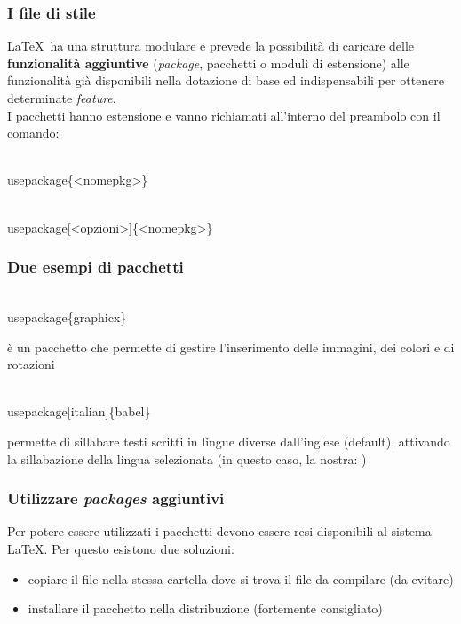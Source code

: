 \documentclass[10pt,svgnames,%
ucs,%
pdftex]{mybeamer}
\begin{document}
\begin{frame}
	\frametitle{I file di stile}
	\LaTeX\ ha una struttura modulare e prevede la possibilit\`a di
	caricare delle \textbf{funzionalit\`a aggiuntive} (\textit{package},
	pacchetti o moduli di estensione) alle funzionalit\`a gi\`a disponibili
	nella dotazione di base ed indispensabili per ottenere determinate
	\emph{feature}.\\
	\bigskip
	\onslide<2->
	I pacchetti hanno estensione  e vanno richiamati all'interno del preambolo con il comando:
	\begin{LaTeXcode}
		\\usepackage\{\alert{<nomepkg>}\}\
	\end{LaTeXcode}
	\medskip
	\begin{LaTeXcode}
		\\usepackage[\alert{<opzioni>}]\{<nomepkg>\}\
	\end{LaTeXcode}
\end{frame}
\begin{frame}
	\frametitle{Due esempi di pacchetti}
	\begin{LaTeXcode}
		\\usepackage\{\alert{graphicx}\}
	\end{LaTeXcode}
	 \`e un pacchetto che permette di gestire l'inserimento
	delle immagini, dei colori e di rotazioni
	\bigskip
	\onslide<2->
	\begin{LaTeXcode}
		\\usepackage[\alert{italian}]\{\alert{babel}\}
	\end{LaTeXcode}
	 permette di sillabare testi scritti in lingue diverse 
	dall'inglese (default), attivando la sillabazione della lingua
	selezionata (in questo caso, la nostra: \LCmd[]{italian})
\end{frame}
\begin{frame}
	\frametitle{Utilizzare \textit{packages} aggiuntivi}
	Per potere essere utilizzati i pacchetti devono essere resi
	disponibili al sistema \LaTeX. Per questo esistono due soluzioni:
	\begin{itemize}
		\item copiare il file \LCmd[]{package.sty} nella stessa cartella dove si trova il file  da compilare (da evitare)
		\item installare il pacchetto nella distribuzione (fortemente consigliato)
	\end{itemize}
\end{frame}
\end{document}
